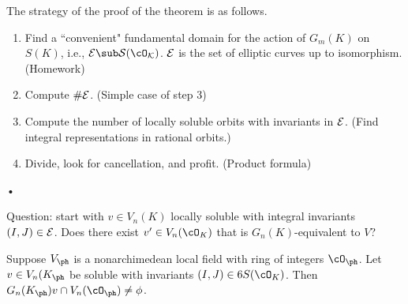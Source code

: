 The strategy of the proof of the theorem is as follows.
\begin{enumerate}
\item
Find a ``convenient" fundamental domain for the action of $G_m(K)$ on $S(K)$, i.e., $\cal E\sub S(\cO_K)$. $\cal E$ is the set of elliptic curves up to isomorphism. (Homework)
\item Compute $\#\cal E$. (Simple case of step 3)
\item Compute the number of locally soluble orbits with  invariants in $\cal E$. (Find integral representations in rational orbits.)
\item
Divide, look for cancellation, and profit. (Product formula)
\end{enumerate}•

Question: start with $v\in V_n(K)$ locally soluble with integral invariants $(I,J)\in \cal E$. Does there exist $v'\in V_n(\cO_K)$ that is $G_n(K)$-equivalent to $V$?

\begin{thm}
Suppose $V_\ph$ is a nonarchimedean local field with ring of integers $\cO_\ph$. Let $v\in V_n(K_\ph$ be soluble with invariants $(I,J)\in 6S(\cO_K)$. Then $G_n(K_\ph)v\cap V_n(\cO_\ph)\ne \phi$.

\end{thm}


